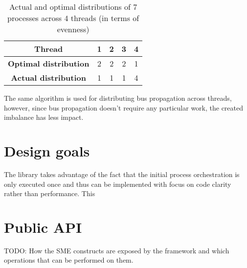 
\begin{table}
\centering
\begin{tabular}{|c|c|c|c|c|}
\hline
\textbf{Thread} & \textbf{1} & \textbf{2} & \textbf{3} & \textbf{4} \\\hline
\textbf{Optimal distribution} & 2 & 2 & 2 & 1 \\\hline
\textbf{Actual distribution} & 1 & 1 & 1 & 4 \\\hline
\end{tabular}
\caption{Actual and optimal distributions of 7
  processes across 4 threads (in terms of evenness)}
\label{tab:procdist}
\end{table}

The same algorithm is used for distributing bus propagation across
threads, however, since bus propagation doesn't require any particular
work, the created imbalance has less impact.

\section{Design goals}
The library takes advantage of the fact that the initial process
orchestration is only executed once and thus can be implemented with
focus on code clarity rather than performance. This

\section{Public API}
TODO: How the SME constructs are exposed by the framework and which
operations that can be performed on them.




